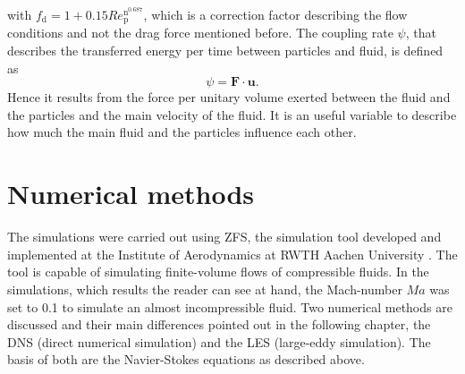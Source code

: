 \documentclass[11pt,a4paper,openany,oneside,parskip=half*]{article}
\renewcommand*\vec[1]{\boldsymbol{#1}}
\begin{document}
with $f_\mathrm{d} = 1+0.15Re_\mathrm{p}^\mathrm{n^{0.687}}$, which is a correction factor describing the flow conditions and not the drag force mentioned before.
\newline
The coupling rate $\psi$, that describes the transferred energy per time between particles and fluid, is defined as
\begin{equation}
\psi = \vec{F} \cdot \vec{u}. 
\end{equation}
Hence it results from the force per unitary volume exerted between the fluid and the particles and the main velocity of the fluid.
It is an useful variable to describe how much the main fluid and the particles influence each other.
\pagebreak
\section{Numerical methods} %
The simulations were carried out using ZFS, the simulation tool developed and implemented at the Institute of Aerodynamics at RWTH Aachen University 
\cite{anAdaptiveMultilevelMultigridFormulationForCartesianHierarchicalGridMethods} \cite{aStrictlyConservativeCartesianCutCellMethodForCompressibleViscousFlowsOnAdaptiveGrids}. 
The tool is capable of simulating finite-volume flows of compressible fluids. In the simulations, which results the reader can see at hand, the Mach-number $Ma$ was set to 0.1 to simulate an almost incompressible fluid.
\newline
Two numerical methods are discussed and their main differences pointed out in the following chapter, the DNS (direct numerical simulation) and the LES (large-eddy simulation). The basis of both are the Navier-Stokes equations as described above.
\end{document}
